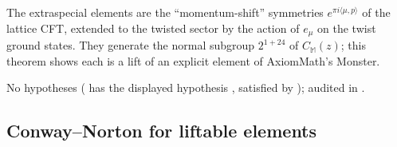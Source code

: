 \begin{physics}
The extraspecial elements are the ``momentum-shift'' symmetries $e^{\pi i\langle\mu,p\rangle}$ of the
lattice CFT, extended to the twisted sector by the action of $e_\mu$ on the twist ground states.  They
generate the normal subgroup $2^{1+24}$ of $C_{\mathbb M}(z)$; this theorem shows each is a lift of an
explicit element of AxiomMath's Monster.
\end{physics}
\begin{status}
No hypotheses ( has the displayed hypothesis , satisfied by
); audited in .
\end{status}

\subsection{Conway--Norton for liftable elements}

